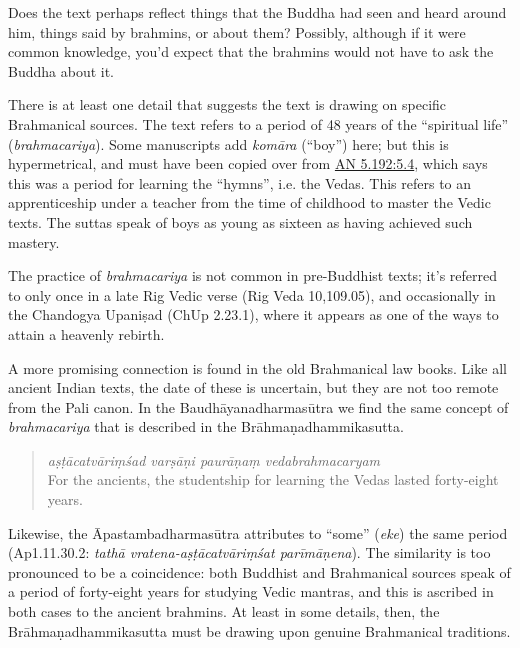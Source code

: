 \documentclass[12pt,openany]{book}%
\begin{document}
Does the text perhaps reflect things that the Buddha had seen and heard around him, things said by brahmins, or about them? Possibly, although if it were common knowledge, you’d expect that the brahmins would not have to ask the Buddha about it.

There is at least one detail that suggests the text is drawing on specific Brahmanical sources. The text refers to a period of 48 years of the “spiritual life” (\textit{brahmacariya}). Some manuscripts add \textit{\textsanskrit{komāra}} (“boy”) here; but this is hypermetrical, and must have been copied over from \href{https://suttacentral.net/an5.192/en/sujato\#5.4}{AN 5.192:5.4}, which says this was a period for learning the “hymns”, i.e. the Vedas. This refers to an apprenticeship under a teacher from the time of childhood to master the Vedic texts. The suttas speak of boys as young as sixteen as having achieved such mastery.

The practice of \textit{brahmacariya} is not common in pre-Buddhist texts; it’s referred to only once in a late Rig Vedic verse (Rig Veda 10,109.05), and occasionally in the Chandogya \textsanskrit{Upaniṣad} (ChUp 2.23.1), where it appears as one of the ways to attain a heavenly rebirth.

A more promising connection is found in the old Brahmanical law books. Like all ancient Indian texts, the date of these is uncertain, but they are not too remote from the Pali canon. In the \textsanskrit{Baudhāyanadharmasūtra} we find the same concept of \textit{brahmacariya} that is described in the \textsanskrit{Brāhmaṇadhammikasutta}.

\begin{quotation}%
\textit{\textsanskrit{aṣṭācatvāriṃśad} \textsanskrit{varṣāṇi} \textsanskrit{paurāṇaṃ} vedabrahmacaryam} \\
For the ancients, the studentship for learning the Vedas lasted forty-eight years.

%
\end{quotation}

Likewise, the \textsanskrit{Āpastambadharmasūtra} attributes to “some” (\textit{eke}) the same period (Ap1.11.30.2: \textit{\textsanskrit{tathā} vratena-\textsanskrit{aṣṭācatvāriṃśat} \textsanskrit{parīmāṇena}}). The similarity is too pronounced to be a coincidence: both Buddhist and Brahmanical sources speak of a period of forty-eight years for studying Vedic mantras, and this is ascribed in both cases to the ancient brahmins. At least in some details, then, the \textsanskrit{Brāhmaṇadhammikasutta} must be drawing upon genuine Brahmanical traditions.
\end{document}
